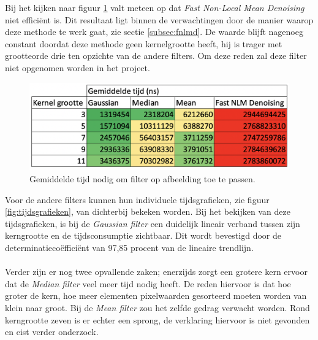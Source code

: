 Bij het kijken naar figuur \ref{fig:tijd} valt meteen op dat \textit{Fast Non-Local Mean Denoising} niet efficiënt is. Dit resultaat ligt binnen de verwachtingen door de manier waarop deze methode te werk gaat, zie sectie \ref{subsec:fnlmd}. De waarde blijft nagenoeg constant doordat deze methode geen kernelgrootte heeft, hij is trager met grootteorde drie ten opzichte van de andere filters. Om deze reden zal deze filter niet opgenomen worden in het project. 

\begin{figure}[h!]
    \centering
    \includegraphics[scale=0.5]{img/tijdsconsumptie}
    \caption{Gemiddelde tijd nodig om filter op afbeelding toe te passen.}
    \label{fig:tijd}
\end{figure}

Voor de andere filters kunnen hun individuele tijdsgrafieken, zie figuur \ref{fig:tijdsgrafieken}, van dichterbij bekeken worden. 
Bij het bekijken van deze tijdsgrafieken, is bij de \textit{Gaussian filter} een duidelijk lineair verband tussen zijn kerngrootte en de tijdsconsumptie zichtbaar. Dit wordt bevestigd door de determinatiecoëfficiënt van 97,85 procent van de lineaire trendlijn. 

\paragraph{}
Verder zijn er nog twee opvallende zaken; enerzijds zorgt een grotere kern ervoor dat de \textit{Median filter} veel meer tijd nodig heeft. De reden hiervoor is dat hoe groter de kern, hoe meer elementen pixelwaarden gesorteerd moeten worden van klein naar groot. Bij de {\it Mean filter} zou het zelfde gedrag verwacht worden. Rond kerngrootte zeven is er echter een sprong, de verklaring hiervoor is niet gevonden en eist verder onderzoek.

